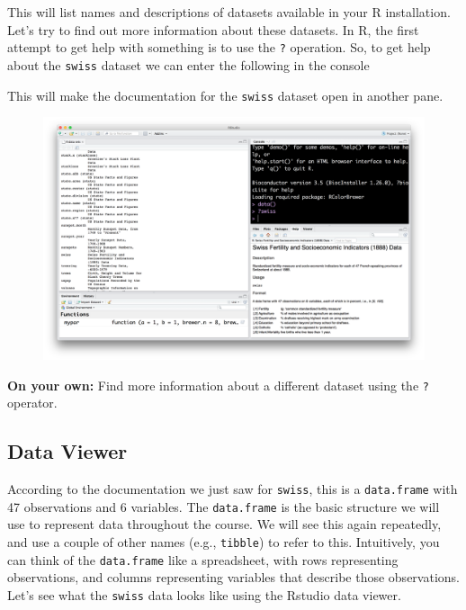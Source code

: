 \documentclass[]{book}
\theoremstyle{definition}
\theoremstyle{definition}
\theoremstyle{remark}
\begin{document}
This will list names and descriptions of datasets available in your R
installation. Let's try to find out more information about these
datasets. In R, the first attempt to get help with something is to use
the \texttt{?} operation. So, to get help about the \texttt{swiss}
dataset we can enter the following in the console

This will make the documentation for the \texttt{swiss} dataset open in
another pane.

\begin{figure}
\centering
\includegraphics{img/rstudio_swiss.png}
\caption{}
\end{figure}

\textbf{On your own:} Find more information about a different dataset
using the \texttt{?} operator.

\subsection{Data Viewer}\label{data-viewer}

According to the documentation we just saw for \texttt{swiss}, this is a
\texttt{data.frame} with 47 observations and 6 variables. The
\texttt{data.frame} is the basic structure we will use to represent data
throughout the course. We will see this again repeatedly, and use a
couple of other names (e.g., \texttt{tibble}) to refer to this.
Intuitively, you can think of the \texttt{data.frame} like a
spreadsheet, with rows representing observations, and columns
representing variables that describe those observations. Let's see what
the \texttt{swiss} data looks like using the Rstudio data viewer.
\end{document}

